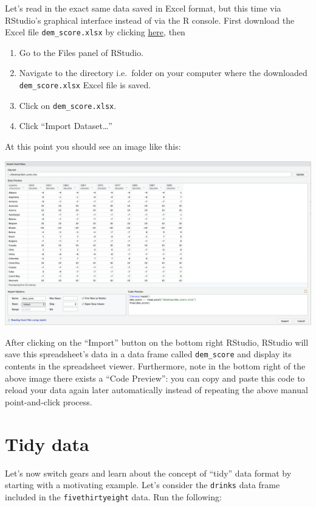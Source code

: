\documentclass[
  letterpaper,
  DIV=11,
  numbers=noendperiod]{scrreprt}
\providecommand{\tightlist}{%
  \setlength{\itemsep}{0pt}\setlength{\parskip}{0pt}}\usepackage{longtable,booktabs,array}
\theoremstyle{definition}
\theoremstyle{remark}
\begin{document}
Let's read in the exact same data saved in Excel format, but this time
via RStudio's graphical interface instead of via the R console. First
download the Excel file \texttt{dem\_score.xlsx} by clicking
\href{https://moderndive.com/data/dem_score.xlsx}{here}, then

\begin{enumerate}
\def\labelenumi{\arabic{enumi}.}
\tightlist
\item
  Go to the Files panel of RStudio.
\item
  Navigate to the directory i.e.~folder on your computer where the
  downloaded \texttt{dem\_score.xlsx} Excel file is saved.
\item
  Click on \texttt{dem\_score.xlsx}.
\item
  Click ``Import Dataset\ldots{}''
\end{enumerate}

At this point you should see an image like this:

\includegraphics{images/read_excel.png}

After clicking on the ``Import'' button on the bottom right RStudio,
RStudio will save this spreadsheet's data in a data frame called
\texttt{dem\_score} and display its contents in the spreadsheet viewer.
Furthermore, note in the bottom right of the above image there exists a
``Code Preview'': you can copy and paste this code to reload your data
again later automatically instead of repeating the above manual
point-and-click process.

\hypertarget{sec-tidy-data-ex}{%
\section{Tidy data}\label{sec-tidy-data-ex}}

Let's now switch gears and learn about the concept of ``tidy'' data
format by starting with a motivating example. Let's consider the
\texttt{drinks} data frame included in the \texttt{fivethirtyeight}
data. Run the following:
\end{document}
